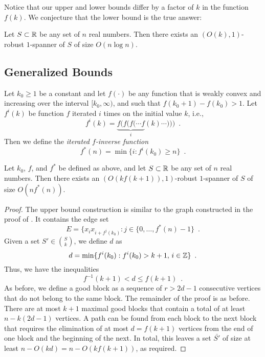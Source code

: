 \documentclass{patmorin}
\begin{document}
Notice that our upper and lower bounds differ by a factor of $k$ in the
function $f(k)$.  We conjecture that the lower bound is the true answer:

\begin{conj}
Let $S\subset \mathbb{R}$ be any set of $n$ real numbers.  Then there exists an
$(O(k),1)$-robust $1$-spanner of $S$ of size $O(n\log n)$.
\end{conj}

\subsection{Generalized Bounds}

Let $k_0\ge 1$ be a constant and let $f(\cdot)$ be any function that is
weakly convex and increasing over the interval $[k_0,\infty)$, and such
that $f(k_0+1)-f(k_0) > 1$.  Let $f^{i}(k)$ be function $f$ iterated
$i$ times on the initial value $k$, i.e.,
\[
   f^{i}(k) = \underbrace{f(f(f(\cdots f}_{i}(k)\cdots))) \enspace .
\]
Then we define the \emph{iterated
$f$-inverse function}
\[
   f^*(n) = \min\{i : f^{i}(k_0) \ge n\} \enspace .
\] 

\begin{thm}
Let $k_0$, $f$, and $f^*$ be defined as above, and let $S\subset \mathbb{R}$ be
any set of $n$ real numbers.  Then there exists an $(O(kf(k+1)),1)$-robust
$1$-spanner of $S$ of size $O(nf^*(n))$.
\end{thm}

\begin{proof}
The upper bound construction is similar to the graph constructed in the
proof of .  It contains the edge set
\[
    E = \{x_ix_{i+f^{j}(k_0)} : j\in\{0,\ldots,f^*(n)-1\} \enspace .
\] 
Given a set $S'\in \binom{S}{k}$, we define $d$ as
\[
   d=\min\{f^i(k_0) : f^i(k_0)> k+1,\, i\in\mathbb{Z}\} \enspace .
\]
Thus, we have the inequalities
\[
     f^{-1}(k+1) < d \le f(k+1) \enspace .
\]
As before, we define a good block as a sequence of $r>2d-1$ consecutive
vertices that do not belong to the same block.  The remainder of the
proof is as before.   There are at most $k+1$ maximal good blocks that
contain a total of at least $n-k(2d-1)$ vertices.  A path can be found
from each block to the next block that requires the elimination of at
most $d=f(k+1)$ vertices from the end of one block and the beginning of
the next.  In total, this leaves a set $\bar{S'}$ of size at least
$n-O(kd) = n - O(kf(k+1))$, as required.
\end{proof}
\end{document}
